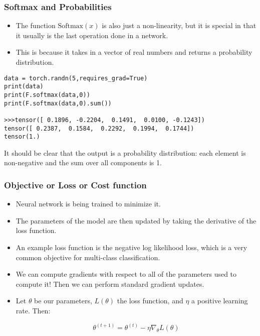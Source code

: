\begin{frame}[fragile]
\frametitle{Softmax and Probabilities}

\begin{itemize}
\item The function $\text{Softmax}(x)$ is also just a non-linearity, but it is special in that it usually is the last operation done in a network. 
\item This is because it takes in a vector of real numbers and returns a probability distribution.
\end{itemize}
 \begin{lstlisting}
data = torch.randn(5,requires_grad=True)
print(data)
print(F.softmax(data,0))
print(F.softmax(data,0).sum())

>>>tensor([ 0.1896, -0.2204,  0.1491,  0.0100, -0.1243])
tensor([ 0.2387,  0.1584,  0.2292,  0.1994,  0.1744])
tensor(1.)
 \end{lstlisting}
It should be clear that the output is a probability distribution: each element is non-negative and the sum over all components is 1.
\end{frame} 

\begin{frame}[fragile]
\frametitle{Objective or Loss or Cost function}

\begin{itemize}
\item Neural network is being trained to minimize it.
\item The parameters of the model are then updated by taking the derivative of the loss function. 
\item An example loss function is the negative log likelihood loss, which is a very common objective for multi-class classification.
\item We can compute gradients with respect to all of the parameters used to compute it! Then we can perform standard gradient updates.
\item Let $\theta$ be our parameters,  $L(\theta)$ the loss function, and $\eta$ a positive learning rate. Then:

$$ \theta^{(t+1)} = \theta^{(t)} - \eta \nabla_\theta L(\theta) $$
\end{itemize}

\end{frame} 

